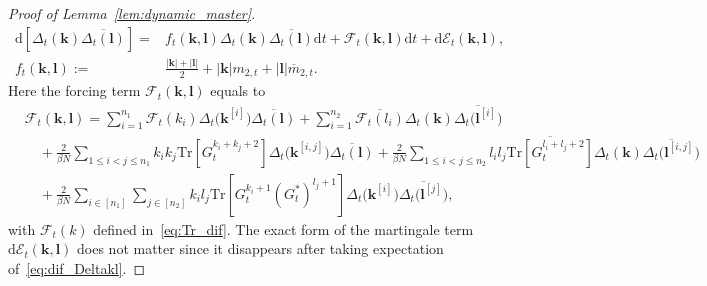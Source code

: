 \documentclass[10pt,a4paper]{amsart}
\newcommand{\Tr}{\mathrm{Tr}}
\newcommand{\dif}{\mathrm{d}}
\begin{document}
\begin{proof}[Proof of Lemma~\ref{lem:dynamic_master}]
\begin{equation}
\begin{split}
\dif \left[\Delta_t(\bm{k})\overline{\Delta_t(\bm{l})}\right] = &f_t(\bm{k},\bm{l}) \Delta_t(\bm{k})\overline{\Delta_t(\bm{l})}\dif t + \mathcal{F}_t(\bm{k},\bm{l})\dif t + \dif \mathcal{E}_t(\bm{k},\bm{l}),\\
f_t(\bm{k},\bm{l}):= &\frac{|\bm{k}|+|\bm{l}|}{2} +|\bm{k}|m_{2,t} + |\bm{l}|\overline{m}_{2,t}.
\end{split}
\label{eq:dif_Deltakl}
\end{equation}
Here the forcing term $\mathcal{F}_t(\bm{k},\bm{l})$ equals to
\begin{equation}
\begin{split}
&\mathcal{F}_t(\bm{k},\bm{l}) = \sum_{i=1}^{n_1}\mathcal{F}_t(k_i)\Delta_t\big(\bm{k}^{[i]}\big) \overline{\Delta_t(\bm{l})} + \sum_{i=1}^{n_2}\overline{\mathcal{F}_t(l_i)}\Delta_t(\bm{k}) \overline{\Delta_t\big(\bm{l}^{[i]}\big)}\\
&\quad+ \frac{2}{\beta N}\!\!\sum_{1\le i<j \le n_1}\!\! k_ik_j \Tr \left[ G_t^{k_i+k_j+2}\right] \Delta_t\big(\bm{k}^{[i,j]}\big)\overline{\Delta_t(\bm{l})} + \frac{2}{\beta N}\!\!\sum_{1\le i<j \le n_2}\!\! l_il_j \overline{\Tr \left[ G_t^{l_i+l_j+2}\right]} \Delta_t(\bm{k})\overline{\Delta_t\big(\bm{l}^{[i,j]}\big)}\\
&\quad+ \frac{2}{\beta N} \sum_{i\in [n_1]}\sum_{j\in [n_2]} k_il_j \Tr\left[ G_t^{k_i+1}(G^*_t)^{l_j+1}\right] \Delta_t\big(\bm{k}^{[i]}\big)\overline{\Delta_t\big(\bm{l}^{[j]}\big)},
\end{split}
\label{eq:F_kl}
\end{equation}
with $\mathcal{F}_t(k)$ defined in~\eqref{eq:Tr_dif}. The exact form of the martingale term $\dif \mathcal{E}_t(\bm{k},\bm{l})$ does not matter since it disappears after taking expectation of~\eqref{eq:dif_Deltakl}.


\end{proof}
\end{document}
